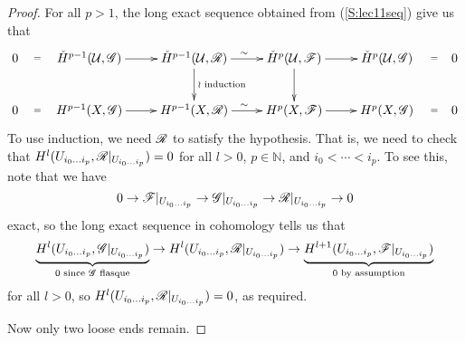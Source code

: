 \begin{proof}
For all $p>1$, the long exact sequence obtained from
(\ref{S:lec11seq}) give us that
\[\xymatrix{
 0\ar@{}[r]|(.3){=} & \check H^{p-1}(\U,\G) \ar[r] &
 \check H^{p-1}(\U,\R) \ar[d]^{\wr\text{ induction}} \ar[r]^{\sim}& \check H^p(\U,\F)\ar[r]\ar[d] & \check H^p(\U,\G)\ar@{}[r]|(.7){=} & 0 \\
 0\ar@{}[r]|(.3){=} & H^{p-1}(X,\G) \ar[r] & H^{p-1}(X,\R) \ar[r]^{\sim} & H^p(X,\F)\ar[r] &
 H^p(X,\G) \ar@{}[r]|(.7){=} & 0
}\]
 To use induction, we need $\mathscr{R}$ to satisfy the hypothesis.  That
 is, we need to check that $H^l(U_{i_0\dots i_p},\mathscr{R}|_{U_{i_0\dots
 i_p}})=0$ for all $l>0$, $p\in \mathbb{N}$, and $i_0<\cdots<i_p$.
 To see this, note that we have
 \[
    0\to \mathscr{F}|_{U_{i_0\dots i_p}} \to \mathscr{G}|_{U_{i_0\dots i_p}} \to
    \mathscr{R}|_ {U_{i_0\dots i_p}}\to 0
 \]
 exact, so the long exact sequence in cohomology tells us that
 \[
    \underbrace{H^l(U_{i_0\dots i_p},\mathscr{G}|_{U_{i_0\dots i_p}})}_{0\text{ since $\mathscr{G}$ flasque}}
    \to H^l(U_{i_0\dots i_p},\mathscr{R}|_{U_{i_0\dots i_p}}) \to \underbrace{H^{l+1}(U_{i_0\dots i_p},\mathscr{F}|_{U_{i_0\dots
    i_p}})}_{0\text{ by assumption}}
 \]
 for all $l>0$, so $H^l(U_{i_0\dots i_p},\mathscr{R}|_{U_{i_0\dots
 i_p}})=0$, as required.

Now only two loose ends remain.
\renewcommand{\qedsymbol}{\text{\tiny proof continued in next lecture}}
\end{proof}
